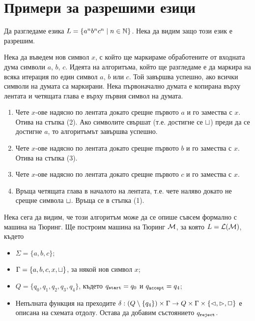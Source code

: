 \section{Примери за разрешими езици}
\label{sect:turing:examples}

\begin{example}
  Да разгледаме езика $L = \{a^nb^nc^n \mid n\in\mathbb{N}\}$.
  Нека да видим защо този език е разрешим.
 
  Нека да въведем нов символ $x$, с който ще маркираме обработените от входната дума символи $a$, $b$, $c$.
  Идеята на алгоритъма, който ще разгледаме е да маркира на всяка итерация по един символ $a$, $b$ или $c$.
  Той завършва успешно, ако всички символи на думата са маркирани.
  Нека първоначално думата е копирана върху лентата и четящата глава е върху първия символ на думата.
  \begin{enumerate}[(1)]
  \item 
    Чете $x$-ове надясно по лентата докато срещне първото $a$ и го замества с $x$. Отива на стъпка (2).
    Ако символите свършат (т.е. достигне се $\sqcup$) преди да се достигне $a$,
    то алгоритъмът завършва успешно.
  \item
    Чете $x$-ове надясно по лентата докато срещне първото $b$ и го замества с $x$.
    Отива на стъпка (3).
  \item
    Чете $x$-ове надясно по лентата докато срещне първото $c$ и го замества с $x$.
  \item
    Връща четящата глава в началото на лентата, т.е. чете наляво докато не срещне символа $\sqcup$.
    Връща се в стъпка (1). 
  \end{enumerate}

  Нека сега да видим, че този алгоритъм може да се опише съвсем формално с машина на Тюринг.
  Ще построим машина на Тюринг $\mathcal{M}$, за която $L = \mathcal{L}(\mathcal{M})$, където
  \begin{itemize}
  \item 
    $\Sigma = \{a,b,c\}$;
  \item
    $\Gamma = \{a,b,c,x,\sqcup\}$, за някой нов символ $x$;
  \item
    $Q = \{q_0,q_1,q_2,q_3,q_4\}$, където $q_{\texttt{start}} = q_0$ и $q_{\texttt{accept}} = q_4$;
  \item
    Непълната функция на преходите $\delta:(Q\setminus\{q_4\})\times\Gamma \to Q\times\Gamma\times\{\lhd,\rhd,\Box\}$
    е описана на схемата отдолу. Остава да добавим състоянието $q_{\texttt{reject}}$.
  \end{itemize}


\end{example}
